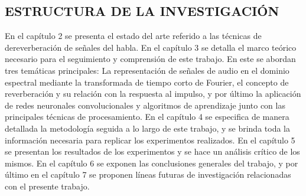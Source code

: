\subsection[Estructura de la Investigación]{ESTRUCTURA DE LA INVESTIGACIÓN}
En el capítulo 2 se presenta el estado del arte referido a las técnicas de dereverberación de señales del habla. 
En el capítulo 3 se detalla el marco teórico necesario para el seguimiento y comprensión de este trabajo. En este se abordan tres temáticas principales: La representación de señales de audio en el dominio espectral mediante la transformada de tiempo corto de Fourier, el concepto de reverberación y su relación con la respuesta al impulso, y por último la aplicación de redes neuronales convolucionales y algoritmos de aprendizaje junto con las principales técnicas de procesamiento.  
En el capítulo 4 se especifica de manera detallada la metodología seguida a lo largo de este trabajo, y se brinda toda la información necesaria para replicar los experimentos realizados. 
En el capítulo 5 se presentan los resultados de los experimentos y se hace un análisis crítico de los mismos. 
En el capítulo 6 se exponen las conclusiones generales del trabajo, y por último en el capítulo 7 se proponen líneas futuras de investigación relacionadas con el presente trabajo. 